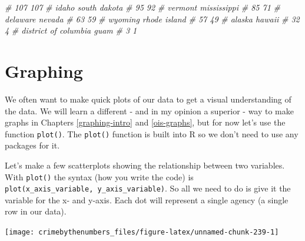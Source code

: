 \documentclass[
]{krantz}
\makeatletter
\newenvironment{Shaded}{\begin{snugshade}}{\end{snugshade}}
\newcommand{\CommentTok}[1]{\textcolor[rgb]{0.37,0.37,0.37}{\textit{#1}}}
\newcommand{\FunctionTok}[1]{\textcolor[rgb]{0,0,0}{#1}}
\newcommand{\NormalTok}[1]{#1}
\newcommand{\SpecialCharTok}[1]{\textcolor[rgb]{0,0,0}{#1}}
\newenvironment{kframe}{%
\medskip{}
\setlength{\fboxsep}{.8em}
 \def\at@end@of@kframe{}%
 \ifinner\ifhmode%
  \def\at@end@of@kframe{\end{minipage}}%
  \begin{minipage}{\columnwidth}%
 \fi\fi%
 \def\FrameCommand##1{\hskip\@totalleftmargin \hskip-\fboxsep
 \colorbox{shadecolor}{##1}\hskip-\fboxsep
     \hskip-\linewidth \hskip-\@totalleftmargin \hskip\columnwidth}%
 \MakeFramed {\advance\hsize-\width
   \@totalleftmargin\z@ \linewidth\hsize
   \@setminipage}}%
 {\par\unskip\endMakeFramed%
 \at@end@of@kframe}
\renewenvironment{Shaded}{\begin{kframe}}{\end{kframe}}
\makeatother
\begin{document}
\begin{Shaded}
\begin{Highlighting}[]
\CommentTok{\#                  107                  107 }
\CommentTok{\#                idaho         south dakota }
\CommentTok{\#                   95                   92 }
\CommentTok{\#              vermont          mississippi }
\CommentTok{\#                   85                   71 }
\CommentTok{\#             delaware               nevada }
\CommentTok{\#                   63                   59 }
\CommentTok{\#              wyoming         rhode island }
\CommentTok{\#                   57                   49 }
\CommentTok{\#               alaska               hawaii }
\CommentTok{\#                   32                    4 }
\CommentTok{\# district of columbia                 guam }
\CommentTok{\#                    3                    1}
\end{Highlighting}
\end{Shaded}

\hypertarget{graphing-1}{%
\section{Graphing}\label{graphing-1}}

We often want to make quick plots of our data to get a
visual understanding of the data. We will learn a different
- and in my opinion a superior - way to make graphs in
Chapters \ref{graphing-intro} and \ref{ois-graphs}, but for
now let's use the function \texttt{plot()}. The
\texttt{plot()} function is built into R so we don't need to
use any packages for it.

Let's make a few scatterplots showing the relationship
between two variables. With \texttt{plot()} the syntax (how
you write the code) is
\texttt{plot(x\_axis\_variable,\ y\_axis\_variable)}. So all
we need to do is give it the variable for the x- and y-axis.
Each dot will represent a single agency (a single row in our
data).

\begin{Shaded}
\end{Shaded}

\begin{center}\texttt{[image: crimebythenumbers\_files/figure-latex/unnamed-chunk-239-1]} \end{center}
\end{document}
